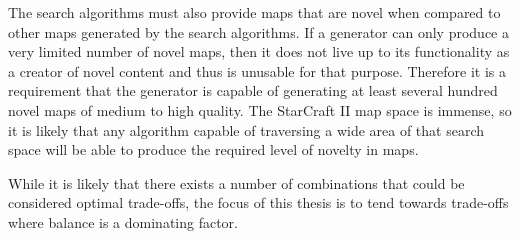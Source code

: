 The search algorithms must also provide maps that are novel when compared to other maps generated by the search algorithms. If a generator can only produce a very limited number of novel maps, then it does not live up to its functionality as a creator of novel content and thus is unusable for that purpose. Therefore it is a requirement that the generator is capable of generating at least several hundred novel maps of medium to high quality. The StarCraft II map space is immense, so it is likely that any algorithm capable of traversing a wide area of that search space will be able to produce the required level of novelty in maps.

While it is likely that there exists a number of combinations that could be considered optimal trade-offs, the focus of this thesis is to tend towards trade-offs where balance is a dominating factor.